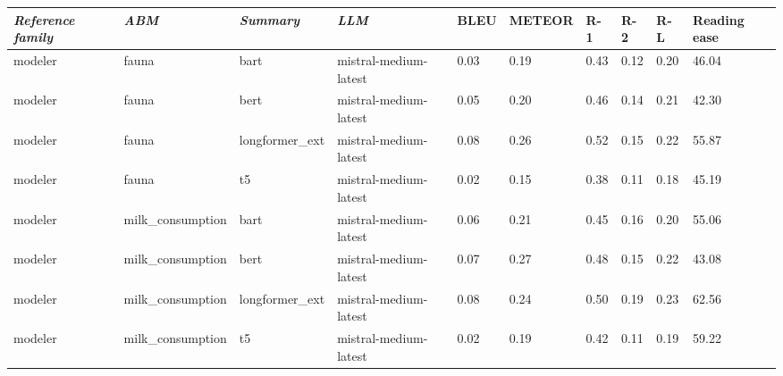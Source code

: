 \begin{tabular}{|l|l|l|l|l|l|l|l|l|l|}
\hline
\textit{\textbf{Reference family}} & \textit{\textbf{ABM}} & \textit{\textbf{Summary}} & \textit{\textbf{LLM}} & BLEU & METEOR & R-1 & R-2 & R-L & Reading ease \\
 \hline
 modeler & fauna & bart & mistral-medium-latest & 0.03 & 0.19 & 0.43 & 0.12 & 0.20 & 46.04 \\
 \hline
 modeler & fauna & bert & mistral-medium-latest & 0.05 & 0.20 & 0.46 & 0.14 & 0.21 & 42.30 \\
 \hline
 modeler & fauna & longformer\_ext & mistral-medium-latest & 0.08 & 0.26 & 0.52 & 0.15 & 0.22 & 55.87 \\
 \hline
 modeler & fauna & t5 & mistral-medium-latest & 0.02 & 0.15 & 0.38 & 0.11 & 0.18 & 45.19 \\
 \hline
 modeler & milk\_consumption & bart & mistral-medium-latest & 0.06 & 0.21 & 0.45 & 0.16 & 0.20 & 55.06 \\
 \hline
 modeler & milk\_consumption & bert & mistral-medium-latest & 0.07 & 0.27 & 0.48 & 0.15 & 0.22 & 43.08 \\
 \hline
 modeler & milk\_consumption & longformer\_ext & mistral-medium-latest & 0.08 & 0.24 & 0.50 & 0.19 & 0.23 & 62.56 \\
 \hline
 modeler & milk\_consumption & t5 & mistral-medium-latest & 0.02 & 0.19 & 0.42 & 0.11 & 0.19 & 59.22 \\
\hline
\end{tabular}
